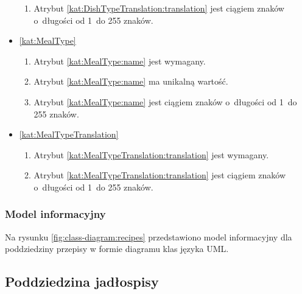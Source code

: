 \begin{itemize}[label={\textbf{Ograniczenia dla}}, wide, labelwidth=!, labelindent=0pt]
\begin{enumerate}[label={\textbf{OGR/3/\protect\twodigits{\arabic{enumi}}}}, wide, labelwidth=!, align=left, leftmargin=3cm, resume]
        \item Atrybut \ref{kat:DishTypeTranslation:translation} jest ciągiem znaków o~długości od 1~do 255 znaków.
    \end{enumerate}

    \item\ref{kat:MealType}\mynobreakpar
    \begin{enumerate}[label={\textbf{OGR/3/\protect\twodigits{\arabic{enumi}}}}, wide, labelwidth=!, align=left, leftmargin=3cm, resume]
        \item Atrybut \ref{kat:MealType:name} jest wymagany.

        \item Atrybut \ref{kat:MealType:name} ma unikalną wartość.

        \item Atrybut \ref{kat:MealType:name} jest ciągiem znaków o~długości od 1~do 255 znaków.
    \end{enumerate}

    \item\ref{kat:MealTypeTranslation}\mynobreakpar
    \begin{enumerate}[label={\textbf{OGR/3/\protect\twodigits{\arabic{enumi}}}}, wide, labelwidth=!, align=left, leftmargin=3cm, resume]
        \item Atrybut \ref{kat:MealTypeTranslation:translation} jest wymagany.

        \item Atrybut \ref{kat:MealTypeTranslation:translation} jest ciągiem znaków o~długości od 1~do 255 znaków.
    \end{enumerate}
\end{itemize}

\subsubsection{Model informacyjny}\label{subsubsec:database:recipes:domainModel}

Na rysunku \ref{fig:class-diagram:recipes} przedstawiono model informacyjny dla poddziedziny przepisy w formie diagramu klas języka UML.


\subsection{Poddziedzina jadłospisy}\label{subsec:database:mealplans}

